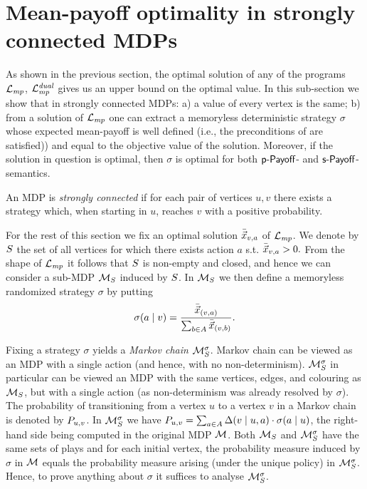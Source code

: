 \section{Mean-payoff optimality in strongly connected MDPs}

As shown in the previous section, the optimal solution of any of the programs $\mathcal{L}_{\mathit{mp}}$, $\mathcal{L}_{\mathit{mp}}^{\mathit{dual}}$ gives us an upper bound on the optimal value. In this sub-section we show that in strongly connected MDPs: a) a value of every vertex is the same; b) from a solution of $\mathcal{L}_{\mathit{mp}}$ one can extract a memoryless deterministic strategy $\sigma$ whose expected mean-payoff is well defined (i.e., the preconditions of  are satisfied)) and equal to the objective value of the solution. Moreover, if the solution in question is optimal, then $ \sigma $ is optimal for both $\textsf{p-Payoff}$- and $\textsf{s-Payoff}$-semantics.

\begin{definition}
\label{5-def:scc-mdp}
An MDP is \emph{strongly connected} if for each pair of vertices $u,v$ there exists a strategy which, when starting in $u$, reaches $v$ with a positive probability. 
\end{definition}

For the rest of this section we fix an optimal solution $\bar{\vec{x}}_{v,a}$ of $\mathcal{L}_{\mathit{mp}}$. We denote by $S$ the set of all vertices for which there exists action $a$ s.t. $\bar{\vec{x}}_{v,a}>0.$ From the shape of $\mathcal{L}_{\mathit{mp}}$ it follows that $S$ is non-empty and closed, and hence we can consider a sub-MDP $\mathcal{M}_{S}$ induced by $S$. In $\mathcal{M}_{S}$ we then define a memoryless randomized strategy $\sigma$ by putting $$\sigma(a\mid v)=\frac{\bar{\vec{x}}_{(v,a)}}{\sum_{b\in A}\bar{\vec{x}}_{(v,b)}}.$$

Fixing a strategy $\sigma$ yields a \emph{Markov chain} $\mathcal{M}_S^{\sigma}$. Markov chain can be viewed as an MDP with a single action (and hence, with no non-determinism). $\mathcal{M}_{S}^\sigma$ in particular can be viewed an MDP with the same vertices, edges, and colouring as $\mathcal{M}_S$, but with a single action (as non-determinism was already resolved by $\sigma$). The probability of transitioning from a vertex $u$ to a vertex $v$ in a Markov chain is denoted by $P_{u,v}$. In $\mathcal{M}_{S}^{\sigma}$ we have $P_{u,v}=\sum_{a\in A} \Delta(v\mid u,a)\cdot\sigma(a\mid u)$, the right-hand side being computed in the original MDP $\mathcal{M}$. Both $\mathcal{M}_S$ and $\mathcal{M}_{S}^{\sigma}$ have the same sets of plays and for each initial vertex, the probability measure induced by $\sigma$ in $\mathcal{M}$ equals the probability measure arising (under the unique policy) in $\mathcal{M}_{S}^{\sigma}$. Hence, to prove anything about $\sigma$ it suffices to analyse $\mathcal{M}_{S}^{\sigma}$.

